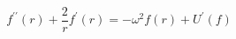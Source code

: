 \begin{equation}
f^{\prime \prime }(r)+\frac{2}{r}f^{\prime }(r)=-\omega ^{2}f(r)+U^{\prime
}(f)  \label{gene}
\end{equation}%
